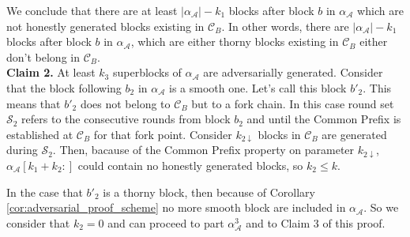 We conclude that there are at least $\vert\alpha_\mathcal{A}\vert - k_1$
blocks after block $b$ in $\alpha_\mathcal{A}$ which are not honestly generated blocks existing in
$\mathcal{C}_B$. In other words, there are $\vert \alpha_\mathcal{A} \vert - k_1$
blocks after block $b$ in $\alpha_\mathcal{A}$, which are either thorny blocks existing in $\mathcal{C}_B$ either don't belong in $\mathcal{C}_B$.\\

\textbf{Claim 2.} 
At least $k_3$ superblocks of $\alpha_\mathcal{A}$ are adversarially generated.
Consider that the block following $b_2$ in $\alpha_\mathcal{A}$ is a smooth one. Let's call this block $b'_2$. This means that $b'_2$ does not belong to $\mathcal{C}_B$ but to a fork chain. In this case round set $\mathcal{S}_2$ refers to the consecutive rounds from block $b_2$ and until the Common Prefix is established at $\mathcal{C}_B$ for that fork point. Consider $k_{2\downarrow}$ blocks in $\mathcal{C}_B$ are generated during $\mathcal{S}_2$. Then, bacause of the Common Prefix property on parameter $k_{2\downarrow}$, $\alpha_\mathcal{A}[k_{1}+k_{2}:]$ could contain no honestly generated blocks, so $k_2 \leq k$.

In the case that $b'_2$ is a thorny block, then because of Corollary \ref{cor:adversarial_proof_scheme} no more smooth block are included in $\alpha_\mathcal{A}$. So we consider that $k_2 = 0$ and can proceed to part $\alpha_\mathcal{A}^3$ and to Claim 3 of this proof.\\

